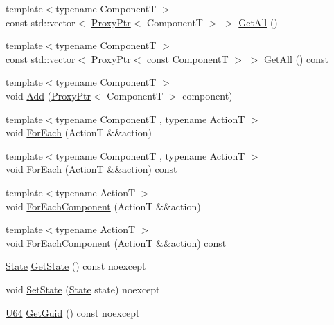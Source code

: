 \begin{DoxyCompactItemize}
\item 
{\footnotesize template$<$typename ComponentT $>$ }\\const std\+::vector$<$ \mbox{\hyperlink{classmage_1_1_proxy_ptr}{Proxy\+Ptr}}$<$ ComponentT $>$ $>$ \mbox{\hyperlink{classmage_1_1_node_aaff260f8a6e8741dc7d56ca1fceb7b0f}{Get\+All}} ()
\item 
{\footnotesize template$<$typename ComponentT $>$ }\\const std\+::vector$<$ \mbox{\hyperlink{classmage_1_1_proxy_ptr}{Proxy\+Ptr}}$<$ const ComponentT $>$ $>$ \mbox{\hyperlink{classmage_1_1_node_a920ff966a7f970189fcbae86025ab3aa}{Get\+All}} () const
\item 
{\footnotesize template$<$typename ComponentT $>$ }\\void \mbox{\hyperlink{classmage_1_1_node_a58452a6195ebea7a1a7a26f9a4dd8102}{Add}} (\mbox{\hyperlink{classmage_1_1_proxy_ptr}{Proxy\+Ptr}}$<$ ComponentT $>$ component)
\item 
{\footnotesize template$<$typename ComponentT , typename ActionT $>$ }\\void \mbox{\hyperlink{classmage_1_1_node_a89df078cbf010b44248a9afd3a65e89d}{For\+Each}} (ActionT \&\&action)
\item 
{\footnotesize template$<$typename ComponentT , typename ActionT $>$ }\\void \mbox{\hyperlink{classmage_1_1_node_a4228ad014440ea626a61cd409f9caf66}{For\+Each}} (ActionT \&\&action) const
\item 
{\footnotesize template$<$typename ActionT $>$ }\\void \mbox{\hyperlink{classmage_1_1_node_a551a6d9590bebdde1499bb28a98fb2c5}{For\+Each\+Component}} (ActionT \&\&action)
\item 
{\footnotesize template$<$typename ActionT $>$ }\\void \mbox{\hyperlink{classmage_1_1_node_abbe2587f1fee0ec98e96fb6ece7c4bb1}{For\+Each\+Component}} (ActionT \&\&action) const
\item 
\mbox{\hyperlink{namespacemage_ae47d13d8477ee94893b9a3947d28eebc}{State}} \mbox{\hyperlink{classmage_1_1_node_a05980bc835cf8da96a9abb225eae72da}{Get\+State}} () const noexcept
\item 
void \mbox{\hyperlink{classmage_1_1_node_a9511a52ddcc0bba71a0353338dcd1d9b}{Set\+State}} (\mbox{\hyperlink{namespacemage_ae47d13d8477ee94893b9a3947d28eebc}{State}} state) noexcept
\item 
\mbox{\hyperlink{namespacemage_ae0ad2dd0035dba92ed0f2e84c182b03b}{U64}} \mbox{\hyperlink{classmage_1_1_node_a69d5c613982a4dfd5175538aff6a07a5}{Get\+Guid}} () const noexcept

\end{DoxyCompactItemize}
